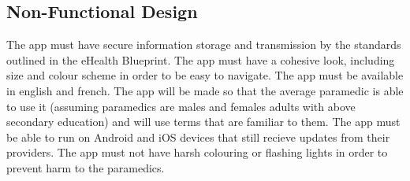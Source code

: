 \subsection{Non-Functional Design}
The app must have secure information storage and transmission by the standards outlined in the eHealth Blueprint. The app must have a cohesive look, including size and colour scheme in order to be easy to navigate. The app must be available in english and french. The app will be made so that the average paramedic is able to use it (assuming paramedics are males and females adults with above secondary education) and will use terms that are familiar to them.
The app must be able to run on Android and iOS devices that still recieve updates from their providers. The app must not have harsh colouring or flashing lights in order to prevent harm to the paramedics.
